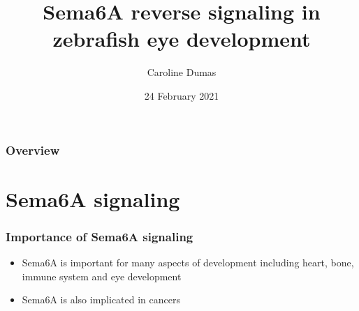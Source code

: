 \documentclass[12pt]{beamer}\usepackage[]{graphicx}\usepackage[]{color}
\title[Sema6A Reverse Signaling]{Sema6A reverse signaling in zebrafish eye development} %
\author{Caroline Dumas} %
\institute[UVM] %
{
University of Vermont \\ %
Department of Biology \\
Burlington, VT 05401 USA \\ 
\medskip
\textit{cmdumas@uvm.edu} %
}
\date{24 February 2021} %
\begin{document}
\begin{frame}
\titlepage %
\end{frame}


\begin{frame}
\frametitle{Overview} %
\tableofcontents %
\end{frame}

\section{Sema6A signaling} %


\begin{frame}
\frametitle{Importance of Sema6A signaling}
\begin{itemize}
\item<1-> Sema6A is important for many aspects of development including heart, bone, immune system and eye development 
\item<2-> Sema6A is also implicated in cancers 
\end{itemize}
\end{frame}
\end{document}
